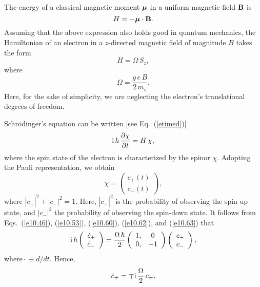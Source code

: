 The energy of a classical magnetic moment $\mbox{\boldmath$\mu$}$ in a uniform magnetic field ${\bf B}$ is
\begin{equation}\label{e10.60a}
H = - \mbox{\boldmath$\mu$}\cdot {\bf B}.
\end{equation}
Assuming that the above expression also holds good in quantum mechanics,
the Hamiltonian of an electron in a $z$-directed magnetic field of magnitude
$B$ takes the form
\begin{equation}\label{e10.60}
H = \Omega\,S_z,
\end{equation}
where
\begin{equation}
\Omega = \frac{g\,e\,B}{2\,m_e}.
\end{equation}
Here, for the sake of simplicity, we are neglecting the electron's translational degrees of freedom.

Schr\"{o}dinger's equation can be written
[see Eq.~(\ref{etimed})]
\begin{equation}\label{e10.62}
{\rm i}\,\hbar\,\frac{\partial\chi}{\partial t} = H\,\chi,
\end{equation}
where the spin state of the electron is characterized by the spinor $\chi$.
Adopting the Pauli representation, we obtain
\begin{equation}\label{e10.63}
\chi = \left(\begin{array}{c}c_+(t)\\c_-(t)\end{array}\right),
\end{equation}
where $|c_+|^2+|c_-|^2=1$. Here, $|c_+|^2$ is the probability of observing the
spin-up state, and $|c_-|^2$ the probability of observing the spin-down
state. It follows from Eqs.~(\ref{e10.46}), (\ref{e10.53}), (\ref{e10.60}),
(\ref{e10.62}), and (\ref{e10.63}) that
\begin{equation}
{\rm i}\,\hbar\left(\begin{array}{c}\dot{c}_+\\\dot{c}_-\end{array}\right)
=\frac{\Omega\,\hbar}{2} \left(\begin{array}{cc}1,&0\\
0,& -1\end{array}\right)\left(\begin{array}{c}c_+\\c_-\end{array}\right),
\end{equation}
where $\dot{~}\equiv d/dt$.
Hence, 
\begin{equation}\label{e10.65}
\dot{c}_\pm = \mp {\rm i}\,\frac{\Omega}{2}\,c_\pm.
\end{equation}
